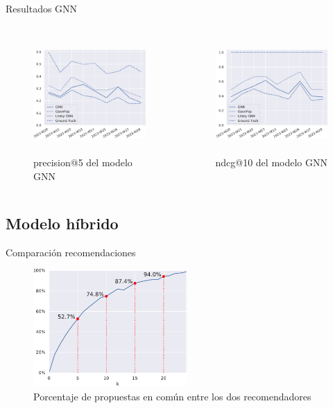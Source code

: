 \begin{frame}{Resultados GNN}
\begin{columns}
\begin{figure}
    \centering
    \includegraphics[height=45mm]{./images/graphs/09_gnn_results_precision_5_leaky.pdf}
    \caption{precision@5 del modelo GNN}
\end{figure}
\begin{figure}
    \centering
    \includegraphics[height=45mm]{./images/graphs/09_gnn_results_ndcg_10_leaky.pdf}
    \caption{ndcg@10 del modelo GNN}
\end{figure}
\end{columns}
\end{frame}

\subsection{Modelo híbrido}
\begin{frame}{Comparación recomendaciones}
    \begin{figure}
        \centering
        \includegraphics[height=45mm]{./images/graphs/12_hybrid_common_Decentraland_W-THU_normalize=True.pdf}
        \caption{Porcentaje de propuestas en común entre los dos recomendadores}
    \end{figure}
\end{frame}    

